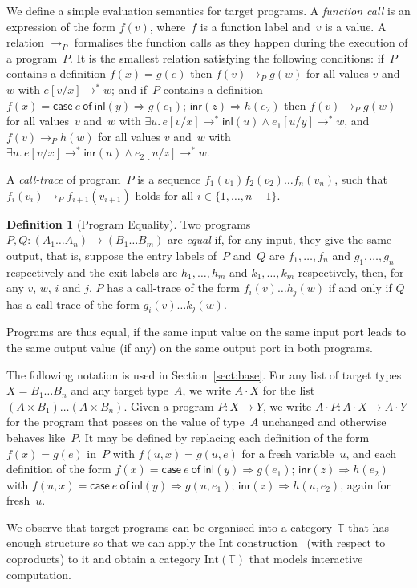 \documentclass{LMCS}
\theoremstyle{definition}
\newtheorem{definition}[thm]{Definition}
\theoremstyle{plain}
\newcommand{\red}{\longrightarrow}
\newcommand{\kw}[1]{\mathsf{#1}}
\newcommand{\tcase}[5]{\kw{case}\ #1\ \kw{of}\ \kw{inl}(#2) \Rightarrow #3;\, \kw{inr}(#4) \Rightarrow #5}
\newcommand{\TT}{\mathbb{T}}
\newcommand{\Int}[1]{\textrm{Int}(#1)}
\begin{document}
We define a simple evaluation semantics for target programs.
A \emph{function call} is an expression of the form $f(v)$, 
where~$f$ is a function label and~$v$ is a value.
A relation $\red_P$ formalises the function calls
as they happen during the execution of a program~$P$.
It is the smallest relation satisfying the following 
conditions: if~$P$ contains
a definition $f(x)=g(e)$ 
then $f(v) \red_P g(w)$ for all values $v$ and~$w$ with $e[v/x] \red^* w$;
and if~$P$
contains a definition $f(x)=\tcase e y {g(e_1)} z {h(e_2)}$
then $f(v) \red_P g(w)$ 
for all values~$v$ and~$w$ with $\exists u.\, e[v/x] \red^* \kw{inl}(u) \land e_1[u/y]\red^* w$,
and $f(v) \red_P h(w)$
for all values $v$ and~$w$ with $\exists u.\, e[v/x] \red^* \kw{inr}(u) \land e_2[u/z]\red^* w$.

A \emph{call-trace} of program~$P$ is a sequence
$f_1(v_1)f_2(v_2)\dots f_n(v_n)$, such that 
$f_i(v_i) \red_P f_{i+1}(v_{i+1})$ holds for all $i\in \{1,\dots, n-1\}$.

\begin{definition}[Program Equality]
\label{def:eq}
Two programs 
$P, Q\colon (A_1\dots A_n) \to (B_1\dots B_m)$ 
are \emph{equal} if, for any input, they give the same output, that is, 
suppose the entry labels of~$P$ and~$Q$ are
$f_1,\dots,f_n$ and 
$g_1,\dots,g_n$ respectively and
the exit labels are 
$h_1,\dots,h_m$ and 
$k_1,\dots,k_m$ respectively, then,
for any $v$, $w$, $i$ and $j$, 
$P$ has a call-trace of the form $f_i(v)\dots h_j(w)$
if and only if $Q$ has a call-trace 
of the form $g_i(v)\dots k_j(w)$.
\end{definition}
Programs are thus equal, if the same input value on the same input
port leads to the same output value (if any) on the same output port in both
programs.

The following notation is used in Section~\ref{sect:base}.
For any list of target types $X=B_1\dots B_n$ and any target type~$A$,
we write $A\cdot X$ for the list $(A\times B_1)\dots (A\times B_n)$.
Given a program $P\colon X \to Y$, we write 
$A\cdot P \colon A\cdot X \to A\cdot Y$ for the program 
that passes on the value of type~$A$ unchanged and otherwise behaves like~$P$.
It may be defined by replacing each definition of the form $f(x)=g(e)$ in~$P$ 
with $f(u,x)=g(u,e)$ for a fresh variable~$u$, 
and each definition of the form $f(x) = \tcase e y {g(e_1)} z {h(e_2)}$
with $f(u,x) = \tcase e y {g(u,e_1)} z {h(u,e_2)}$, again for fresh~$u$.

We observe that target programs can be organised into a category~$\TT$ 
that has enough structure so that we can apply
the Int construction~\cite{Joyal96,Hasegawa09} (with respect to coproducts) to it and
obtain a category $\Int\TT$ that models interactive computation.
\end{document}
